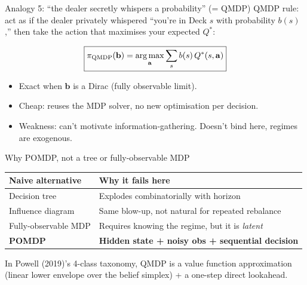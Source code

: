 \documentclass[11pt,aspectratio=169]{beamer}
\newcommand{\argmax}{\operatorname*{arg\,max}}
\begin{document}
\begin{frame}{Analogy 5: ``the dealer secretly whispers a probability'' (= QMDP)}
QMDP rule: act as if the dealer privately whispered ``you're in Deck $s$ with probability $b(s)$,'' then take the action that maximises your expected $Q^\ast$:

\[
\boxed{\pi_{\rm QMDP}(\mathbf{b}) = \argmax_{\mathbf{a}} \sum_s b(s)\,Q^\ast(s, \mathbf{a})}
\]

\bigskip
\begin{itemize}
  \item Exact when $\mathbf{b}$ is a Dirac (fully observable limit).
  \item Cheap: reuses the MDP solver, no new optimisation per decision.
  \item Weakness: can't motivate information-gathering. Doesn't bind here, regimes are exogenous.
\end{itemize}
\end{frame}


\begin{frame}{Why POMDP, not a tree or fully-observable MDP}
\centering
\small\renewcommand{\arraystretch}{1.25}
\begin{tabular}{ll}
\toprule
\textbf{Naive alternative} & \textbf{Why it fails here} \\
\midrule
Decision tree         & Explodes combinatorially with horizon \\
Influence diagram     & Same blow-up, not natural for repeated rebalance \\
Fully-observable MDP  & Requires knowing the regime, but it is \emph{latent} \\
\rowcolor{cb!10}\textbf{POMDP} & \textbf{Hidden state + noisy obs + sequential decision} \\
\bottomrule
\end{tabular}

\bigskip
\small In Powell (2019)'s 4-class taxonomy, QMDP is a \alert{value function approximation} (linear lower envelope over the belief simplex) + a \alert{one-step direct lookahead}.
\end{frame}
\end{document}
